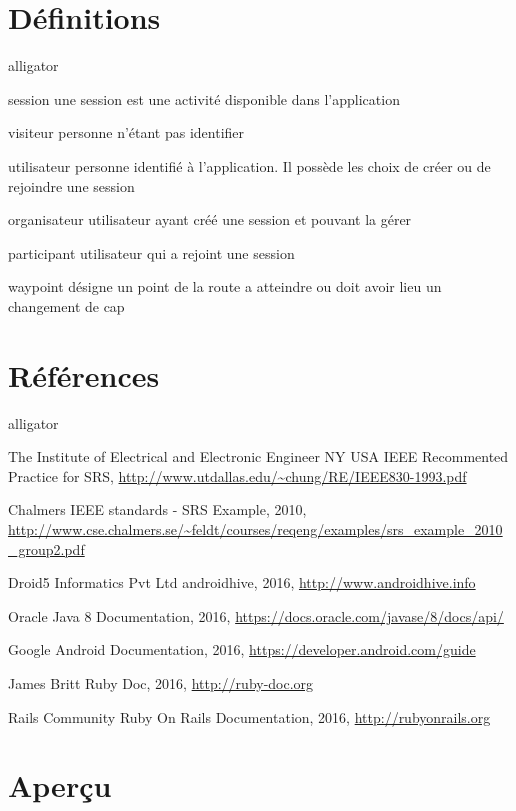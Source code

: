 \documentclass[titlepage, 12pt]{report}
\begin{document}
\section{Définitions}
\begin{labeling}{alligator}
	\item [session] une session est une activité disponible dans l’application
	\item [visiteur] personne n’étant pas identifier
	\item [utilisateur] personne identifié à l’application. Il possède les choix de créer ou de rejoindre une session
	\item [organisateur] utilisateur ayant créé une session et pouvant la gérer
	\item [participant] utilisateur qui a rejoint une session
	\item [waypoint] désigne un point de la route a atteindre ou doit avoir lieu un changement de cap
\end{labeling}


\section{Références}
\begin{labeling}{alligator}
	\item [The Institute of Electrical and Electronic Engineer NY USA] IEEE Recommented Practice for SRS, \url{http://www.utdallas.edu/~chung/RE/IEEE830-1993.pdf}
	\item [Chalmers] IEEE standards - SRS Example, 2010, \url{http://www.cse.chalmers.se/~feldt/courses/reqeng/examples/srs_example_2010_group2.pdf}
	\item [Droid5 Informatics Pvt Ltd] androidhive, 2016, \url{http://www.androidhive.info}
	\item [Oracle] Java 8 Documentation, 2016, \url{https://docs.oracle.com/javase/8/docs/api/}
	\item [Google] Android Documentation, 2016, \url{https://developer.android.com/guide}
	\item [James Britt] Ruby Doc, 2016, \url{http://ruby-doc.org}
	\item [Rails Community] Ruby On Rails Documentation, 2016, \url{http://rubyonrails.org}
\end{labeling}

\section{Aperçu}
\end{document}

